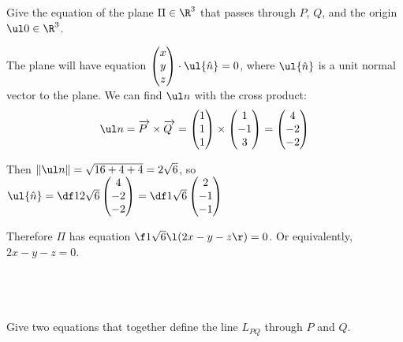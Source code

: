 \documentclass[a4paper]{article}
\begin{document}
\subsection{~} %

\begin{questionbody}
Give the equation of the plane $\Pi \in \R^3$ that passes through $P$, $Q$, and the origin $\ul 0 \in \R^3$.
\end{questionbody}

The plane will have equation $\begin{pmatrix}x \\ y \\ z\end{pmatrix} \cdot \ul{\hat n} = 0$, where $\ul{\hat n}$ is a unit normal vector to the plane. We can find $\ul n$ with the cross product: \[
\ul n = \overrightarrow{P\;} \times \overrightarrow{Q\;}
= \begin{pmatrix}1 \\ 1 \\ 1\end{pmatrix}
\times \begin{pmatrix}1 \\ -1 \\ 3\end{pmatrix}
= \begin{pmatrix}4 \\ -2 \\ -2\end{pmatrix}
\]

Then $\|\ul n\| = \sqrt{16+4+4} = 2\sqrt6$, so $\ul{\hat n} = \df1{2\sqrt6} \begin{pmatrix}4 \\ -2 \\ -2\end{pmatrix} = \df1{\sqrt6} \begin{pmatrix}2 \\ -1 \\ -1\end{pmatrix}$

Therefore $\Pi$ has equation $\f1{\sqrt6} \l( 2x - y - z \r) = 0$. Or equivalently, $2x - y - z = 0$.

\subsection{~} %

\begin{questionbody}
Give two equations that together define the line $L_{PQ}$ through $P$ and $Q$.
\end{questionbody}
\end{document}
